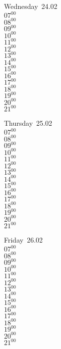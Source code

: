 \documentclass[11pt,a4paper]{book}\usepackage[]{graphicx}\usepackage[]{color}
\begin{document}
\begin{weekdaybox}
  Wednesday~24.02\\
  { 
  \vfill
  $07^{00}$\\
$08^{00}$\\
$09^{00}$\\
$10^{00}$\\
$11^{00}$\\
$12^{00}$\\
$13^{00}$\\
$14^{00}$\\
$15^{00}$\\
$16^{00}$\\
$17^{00}$\\
$18^{00}$\\
$19^{00}$\\
$20^{00}$\\
$21^{00}$\\
  }
\end{weekdaybox}
\clearpage
\begin{headerbox}
\end{headerbox}
\begin{weekdaybox}
  Thursday~25.02\\
  { 
  \vfill
  $07^{00}$\\
$08^{00}$\\
$09^{00}$\\
$10^{00}$\\
$11^{00}$\\
$12^{00}$\\
$13^{00}$\\
$14^{00}$\\
$15^{00}$\\
$16^{00}$\\
$17^{00}$\\
$18^{00}$\\
$19^{00}$\\
$20^{00}$\\
$21^{00}$\\
  }
\end{weekdaybox} 
\begin{weekdaybox}
  Friday~26.02\\
  { 
  \vfill
  $07^{00}$\\
$08^{00}$\\
$09^{00}$\\
$10^{00}$\\
$11^{00}$\\
$12^{00}$\\
$13^{00}$\\
$14^{00}$\\
$15^{00}$\\
$16^{00}$\\
$17^{00}$\\
$18^{00}$\\
$19^{00}$\\
$20^{00}$\\
$21^{00}$\\
  }
\end{weekdaybox}
\end{document}
